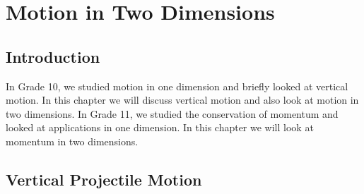 \chapter{Motion in Two Dimensions}
\label{p:m:m2d12}

\section{Introduction}
In Grade 10, we studied motion in one dimension and briefly looked at vertical motion. In this chapter we will discuss vertical motion and also look at motion in two dimensions. In Grade 11, we studied the conservation of momentum and looked at applications in one dimension. In this chapter we will look at momentum in two dimensions.
\section{Vertical Projectile Motion}
